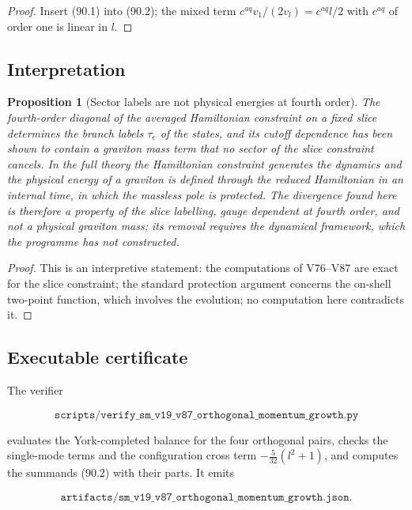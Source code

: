 \documentclass[11pt]{article}
\newtheorem{proposition}[theorem]{Proposition}
\theoremstyle{remark}
\begin{document}
\begin{proof}
Insert (90.1) into (90.2); the mixed term \(c^{aq}v_1/(2v_l)=c^{aq}l/2\)
with \(c^{aq}\) of order one is linear in \(l\).
\end{proof}

\subsection{Interpretation}

\begin{proposition}[Sector labels are not physical energies at fourth order]
\label{prop:v19v87-interpretation}
The fourth-order diagonal of the averaged Hamiltonian constraint on
a fixed slice determines the branch labels \(\tau_e\) of the states, and
its cutoff dependence has been shown to contain a graviton mass term
that no sector of the slice constraint cancels.  In the full theory
the Hamiltonian constraint generates the dynamics and the physical
energy of a graviton is defined through the reduced Hamiltonian in an
internal time, in which the massless pole is protected.  The
divergence found here is therefore a property of the slice
labelling, gauge dependent at fourth order, and not a physical
graviton mass; its removal requires the dynamical framework, which the
programme has not constructed.
\end{proposition}

\begin{proof}
This is an interpretive statement: the computations of V76--V87 are
exact for the slice constraint; the standard protection argument
concerns the on-shell two-point function, which involves the
evolution; no computation here contradicts it.
\end{proof}

\subsection{Executable certificate}

The verifier

\[
 \texttt{scripts/verify\_sm\_v19\_v87\_orthogonal\_momentum\_growth.py}
                                                                    \tag{90.3}
\]

evaluates the York-completed balance for the four orthogonal pairs,
checks the single-mode terms and the configuration cross term
\(-\tfrac5{32}(l^2+1)\), and computes the summands (90.2) with their
parts.  It emits

\[
 \texttt{artifacts/sm\_v19\_v87\_orthogonal\_momentum\_growth.json}. \tag{90.4}
\]
\end{document}
